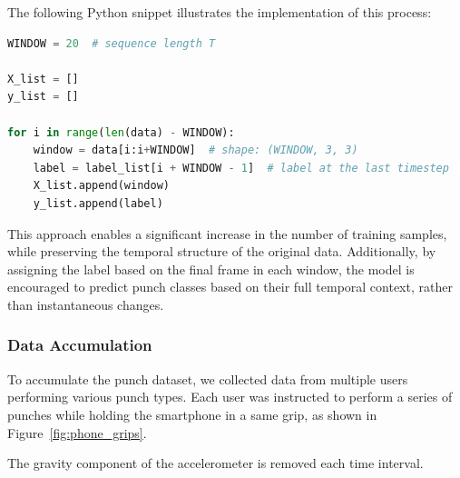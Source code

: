 \documentclass{article}
\begin{document}
The following Python snippet illustrates the implementation of this process:

\begin{lstlisting}[language=Python, caption={Sliding window algorithm for data augmentation}]
WINDOW = 20  # sequence length T

X_list = []
y_list = []

for i in range(len(data) - WINDOW):
    window = data[i:i+WINDOW]  # shape: (WINDOW, 3, 3)
    label = label_list[i + WINDOW - 1]  # label at the last timestep
    X_list.append(window)
    y_list.append(label)
\end{lstlisting}

This approach enables a significant increase in the number of training samples, while preserving the temporal structure of the original data. Additionally, by assigning the label based on the final frame in each window, the model is encouraged to predict punch classes based on their full temporal context, rather than instantaneous changes.






\subsubsection{Data Accumulation}
To accumulate the punch dataset, we collected data from multiple users performing various punch types. Each user was instructed to perform a series of punches while holding the smartphone in a same grip, as shown in Figure~\ref{fig:phone_grips}.

The gravity component of the accelerometer is removed each time interval.
\end{document}
